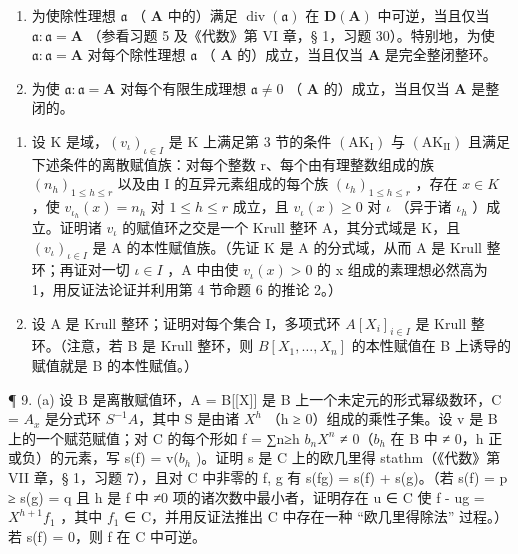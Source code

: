 \begin{enumerate}
\def\labelenumi{(\alph{enumi})}
\item
  为使除性理想 \(\mathfrak{a}\) （ \(\mathbf{A}\) 中的）满足 \(\operatorname{div}(\mathfrak{a})\) 在 \(\mathbf{D}(\mathbf{A})\) 中可逆，当且仅当 \(\mathfrak{a} \colon \mathfrak{a} = \mathbf{A}\) （参看习题 5 及《代数》第 VI 章，§ 1，习题 30）。特别地，为使 \(\mathfrak{a} \colon \mathfrak{a} = \mathbf{A}\) 对每个除性理想 \(\mathfrak{a}\) （ \(\mathbf{A}\) 的）成立，当且仅当 \(\mathbf{A}\) 是完全整闭整环。
\item
  为使 \(\mathfrak{a} \colon \mathfrak{a} = \mathbf{A}\) 对每个有限生成理想 \(\mathfrak{a} \neq 0\) （ \(\mathbf{A}\) 的）成立，当且仅当 \(\mathbf{A}\) 是整闭的。
\end{enumerate}

\begin{enumerate}
\def\labelenumi{\arabic{enumi}.}
\setcounter{enumi}{6}
\item
  设 K 是域，\((v_{\iota})_{\iota \in I}\) 是 K 上满足第 3 节的条件 \((\mathrm{AK}_{\mathrm{I}})\) 与 \((\mathrm{AK}_{\mathrm{II}})\) 且满足下述条件的离散赋值族：对每个整数 r、每个由有理整数组成的族 \((n_{h})_{1 \leqslant h \leqslant r}\) 以及由 I 的互异元素组成的每个族 \((\iota_{h})_{1 \leqslant h \leqslant r}\) ，存在 \(x \in K\) ，使 \(v_{\iota_{h}}(x) = n_{h}\) 对 \(1 \leqslant h \leqslant r\) 成立，且 \(v_{\iota}(x) \geqslant 0\) 对 \(\iota\) （异于诸 \(\iota_{h}\) ）成立。证明诸 \(v_{\iota}\) 的赋值环之交是一个 Krull 整环 A，其分式域是 K，且 \((v_{\iota})_{\iota \in I}\) 是 A 的本性赋值族。（先证 K 是 A 的分式域，从而 A 是 Krull 整环；再证对一切 \(\iota \in I\) ，A 中由使 \(v_{\iota}(x) > 0\) 的 x 组成的素理想必然高为 1，用反证法论证并利用第 4 节命题 6 的推论 2。）
\item
  设 A 是 Krull 整环；证明对每个集合 I，多项式环 \(A[X_{i}]_{i\in I}\) 是 Krull 整环。（注意，若 B 是 Krull 整环，则 \(B[X_{1},\ldots,X_{n}]\) 的本性赋值在 B 上诱导的赋值就是 B 的本性赋值。）
\end{enumerate}

¶ 9. (a) 设 B 是离散赋值环，A = B{[}{[}X{]}{]} 是 B 上一个未定元的形式幂级数环，C = \(A_{x}\) 是分式环 \(S^{-1}A\)，其中 S 是由诸 \(X^{h}\) （h ≥ 0）组成的乘性子集。设 v 是 B 上的一个赋范赋值；对 C 的每个形如 f = ∑n≥h \(b_n X^{n}\) ≠ 0（\(b_h\) 在 B 中 ≠ 0，h 正或负）的元素，写 s(f) = v(\(b_h\) )。证明 s 是 C 上的欧几里得 stathm（《代数》第 VII 章，§ 1，习题 7），且对 C 中非零的 f, g 有 s(fg) = s(f) + s(g)。（若 s(f) = p ≥ s(g) = q 且 h 是 f 中 ≠0 项的诸次数中最小者，证明存在 u ∈ C 使 f - ug = \(X^{h+1} f_1\) ，其中 \(f_1\) ∈ C，并用反证法推出 C 中存在一种 ``欧几里得除法'' 过程。）若 s(f) = 0，则 f 在 C 中可逆。

